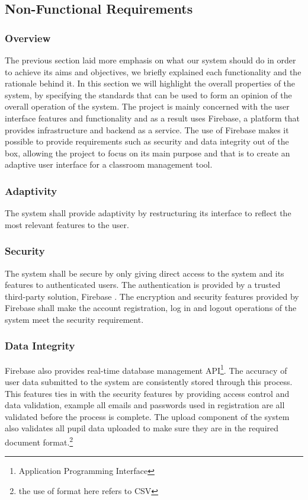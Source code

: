 \subsection{Non-Functional Requirements}
\subsubsection{Overview}
The previous section laid more emphasis on what our system should do in order to achieve its aims and objectives, we briefly explained each functionality and the rationale behind it. In this section we will highlight the overall properties of the system, by specifying the standards that can be used to form an opinion of the overall operation of the system. The project is mainly concerned with the user interface features and functionality and as a result uses Firebase\cite{website:Firebase}, a platform that provides infrastructure and backend as a service. The use of Firebase makes it possible to provide requirements such as security and data integrity out of the box, allowing the project to focus on its main purpose and that is to create an adaptive user interface for a classroom management tool.

\subsubsection{Adaptivity}
The system shall provide adaptivity by restructuring its interface to reflect the most relevant features to the user. 

\subsubsection{Security}
The system shall be secure by only giving direct access to the system and its features to authenticated users. The authentication is provided by a trusted third-party solution, Firebase \cite{website:Firebase}. The encryption and security features provided by Firebase shall make the account registration, log in and logout operations of the system meet the security requirement.

\subsubsection{Data Integrity}
Firebase also provides real-time database management API\footnote{Application Programming Interface}. The accuracy of user data submitted to the system are consistently stored through this process. This features ties in with the security features by providing access control and data validation, example all emails and passwords used in registration are all validated before the process is complete. The upload component of the system also validates all pupil data uploaded to make sure they are in the required document format.\footnote{the use of format here refers to CSV}

